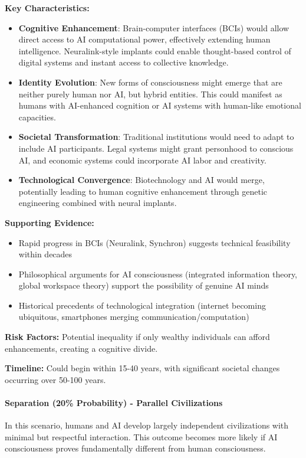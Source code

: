 \documentclass[12pt,a4paper]{article}
\begin{document}
\textbf{Key Characteristics:}
\begin{itemize}
    \item \textbf{Cognitive Enhancement}: Brain-computer interfaces (BCIs) would allow direct access to AI computational power, effectively extending human intelligence. Neuralink-style implants could enable thought-based control of digital systems and instant access to collective knowledge.
    \item \textbf{Identity Evolution}: New forms of consciousness might emerge that are neither purely human nor AI, but hybrid entities. This could manifest as humans with AI-enhanced cognition or AI systems with human-like emotional capacities.
    \item \textbf{Societal Transformation}: Traditional institutions would need to adapt to include AI participants. Legal systems might grant personhood to conscious AI, and economic systems could incorporate AI labor and creativity.
    \item \textbf{Technological Convergence}: Biotechnology and AI would merge, potentially leading to human cognitive enhancement through genetic engineering combined with neural implants.
\end{itemize}

\textbf{Supporting Evidence:}
\begin{itemize}
    \item Rapid progress in BCIs (Neuralink, Synchron) suggests technical feasibility within decades
    \item Philosophical arguments for AI consciousness (integrated information theory, global workspace theory) support the possibility of genuine AI minds
    \item Historical precedents of technological integration (internet becoming ubiquitous, smartphones merging communication/computation)
\end{itemize}

\textbf{Risk Factors:} Potential inequality if only wealthy individuals can afford enhancements, creating a cognitive divide.

\textbf{Timeline:} Could begin within 15-40 years, with significant societal changes occurring over 50-100 years.

\paragraph{Separation (20\% Probability) - Parallel Civilizations}

In this scenario, humans and AI develop largely independent civilizations with minimal but respectful interaction. This outcome becomes more likely if AI consciousness proves fundamentally different from human consciousness.
\end{document}
